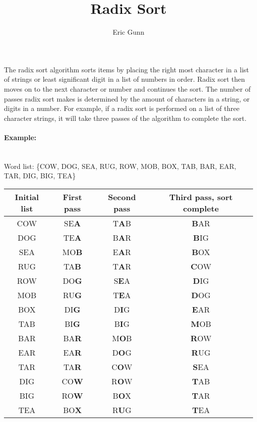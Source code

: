 \documentclass{article}
\title{Radix Sort}
\author{Eric Gunn}
\date{}
\begin{document}
\maketitle

\noindent The radix sort algorithm sorts items by placing the right most character in a list of strings or least significant digit in a list of numbers in order. Radix sort then moves on to the next character or number and continues the sort. The number of passes radix sort makes is determined by the amount of characters in a string, or digits in a number. For example, if a radix sort is performed on a list of three character strings, it will take three passes of the algorithm to complete the sort.
	
\paragraph{Example:}
\noindent \\Word list: 
\{COW, DOG, SEA, RUG, ROW, MOB, BOX, TAB, BAR, EAR, TAR, DIG, BIG, TEA\}
\begin{center}
	\begin{tabular}{| c | c | c | c |}
		\hline
		Initial list & First pass & Second pass & Third pass, sort complete\\
		\hline
		COW & SE\textbf{A} & T\textbf{A}B & \textbf{B}AR\\
		\hline
		DOG & TE\textbf{A} & B\textbf{A}R & \textbf{B}IG\\
		\hline
		SEA & MO\textbf{B} & E\textbf{A}R & \textbf{B}OX\\
		\hline
		RUG & TA\textbf{B} & T\textbf{A}R & \textbf{C}OW\\
		\hline
		ROW & DO\textbf{G} & S\textbf{E}A & \textbf{D}IG\\
		\hline
		MOB & RU\textbf{G} & T\textbf{E}A & \textbf{D}OG\\
		\hline
		BOX & DI\textbf{G} & D\textbf{I}G & \textbf{E}AR\\
		\hline
		TAB & BI\textbf{G} & B\textbf{I}G & \textbf{M}OB\\
		\hline
		BAR & BA\textbf{R} & M\textbf{O}B & \textbf{R}OW\\
		\hline
		EAR & EA\textbf{R} & D\textbf{O}G & \textbf{R}UG\\
		\hline
		TAR & TA\textbf{R} & C\textbf{O}W & \textbf{S}EA\\
		\hline
		DIG & CO\textbf{W} & R\textbf{O}W & \textbf{T}AB\\
		\hline
		BIG & RO\textbf{W} & B\textbf{O}X & \textbf{T}AR\\
		\hline
		TEA & BO\textbf{X} & R\textbf{U}G & \textbf{T}EA\\
		\hline
	\end{tabular}
\end{center}
\end{document}
